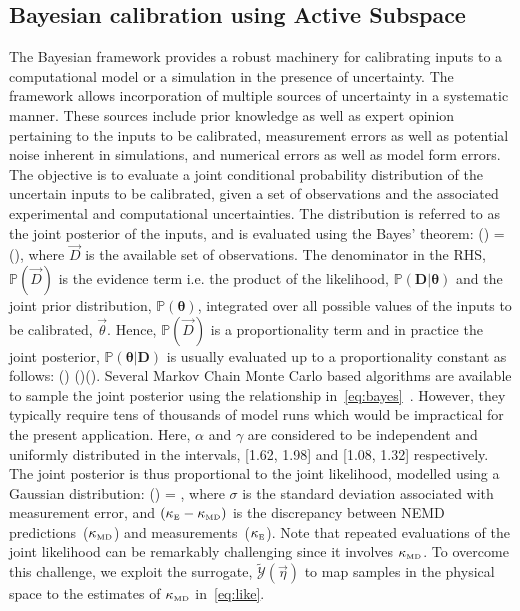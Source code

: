 \subsection{Bayesian calibration using Active Subspace}
\label{sub:ba}

The Bayesian framework provides a robust machinery for calibrating inputs to a computational model or
a simulation in the presence of uncertainty. The framework allows incorporation of multiple
sources of uncertainty in a systematic manner. These sources include prior knowledge as well as
expert opinion pertaining to the inputs to be calibrated, measurement errors as well as potential noise inherent
in simulations, and numerical errors as well as model form errors. The objective is to evaluate a joint
conditional probability distribution of the uncertain inputs to be calibrated, given a set of observations and the
associated experimental and computational uncertainties. The distribution is referred to as the joint posterior of
the inputs, and is evaluated using the Bayes' theorem:
%
\be
{}(\bm{\theta}\vert {}) = 
(\bm{\theta}),
\ee
%
where $\vec{D}$ is the available set of observations. 
The denominator in the RHS, $\mathbb{P}(\vec{D})$ is the evidence term i.e. the product of the likelihood, 
$\mathbb{P}(\bm{D}\vert\bm{\theta})$ and the joint prior distribution,
$\mathbb{P}(\bm{\theta})$, integrated over all possible values of the inputs to be calibrated, $\vec{\theta}$. 
Hence, $\mathbb{P}(\vec{D})$ is a proportionality term and in practice the joint posterior, 
$\mathbb{P}(\bm{\theta}\vert \bm{D})$ is usually evaluated up to a proportionality constant as follows:
%
\be
{}(\bm{\theta}\vert {}) \propto
{}(\vert\bm{\theta})(\bm{\theta}).
\label{eq:bayes}
\ee
%
Several Markov Chain Monte Carlo based algorithms are available to sample the joint posterior using the
relationship in~\eqref{eq:bayes}~\cite{Haario:2001, Haario:2006,Xu:2014}.
However, they typically require tens of thousands of model runs which would be
impractical for the present application. Here, $\alpha$ and $\gamma$ are considered to be independent and
uniformly distributed in the intervals, [1.62, 1.98] and [1.08, 1.32] respectively. The joint posterior is thus 
proportional to the joint likelihood, modelled using a Gaussian distribution:
%
\be
{}(\vert\bm{\theta}) = \exp{},
\label{eq:like}
\ee
%
\noindent where $\sigma$ is the standard deviation associated with measurement error, and
$(\kappa_{\tiny{\mbox{E}}} - \kappa_{\tiny{\mbox{MD}}})$ is the discrepancy between 
NEMD predictions~($\kappa_{\tiny{\mbox{MD}}}$) and measurements~($\kappa_{\tiny{\mbox{E}}}$). 
Note that repeated evaluations of the joint likelihood can be remarkably challenging since it involves 
$\kappa_{\tiny{\mbox{MD}}}$. To overcome this challenge, we exploit the surrogate, 
$\tilde{\mathcal{Y}}(\vec{\eta})$ to map samples in the physical space to the estimates of 
$\kappa_{\tiny{\mbox{MD}}}$ in~\eqref{eq:like}.

